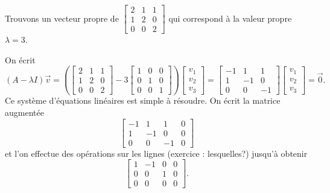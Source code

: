 \begin{example}
Trouvons un vecteur propre de
$\left[ \begin{smallmatrix}
2 & 1 & 1 \\
1 & 2 & 0 \\
0 & 0 & 2
\end{smallmatrix} \right]$ qui correspond à la valeur propre $\lambda = 3$.

On écrit
\begin{equation*}
(A-\lambda I) \vec{v} = 
\left(
\begin{bmatrix}
2 & 1 & 1 \\
1 & 2 & 0 \\
0 & 0 & 2
\end{bmatrix}
- 3
\begin{bmatrix}
1 & 0 & 0 \\
0 & 1 & 0 \\
0 & 0 & 1
\end{bmatrix}
\right)
\begin{bmatrix}
v_1 \\ v_2 \\ v_3
\end{bmatrix}
=
\begin{bmatrix}
-1 & 1 & 1 \\
1 & -1 & 0 \\
0 & 0 & -1
\end{bmatrix}
\begin{bmatrix}
v_1 \\ v_2 \\ v_3
\end{bmatrix}
=
\vec{0} .
\end{equation*}
Ce système d'équations linéaires est simple à résoudre. On écrit la matrice augmentée
\begin{equation*}
\left[
\begin{array}{ccc|c}
-1 & 1 & 1 & 0 \\
1 & -1 & 0 & 0 \\
0 & 0 & -1 & 0
\end{array}
\right]
\end{equation*}
et l'on effectue des opérations sur les lignes (exercice : lesquelles?) jusqu'à obtenir
\begin{equation*}
\left[
\begin{array}{ccc|c}
1 & -1 & 0 & 0 \\
0 & 0 & 1 & 0 \\
0 & 0 & 0 & 0
\end{array}
\right] .
\end{equation*}

\end{example}
